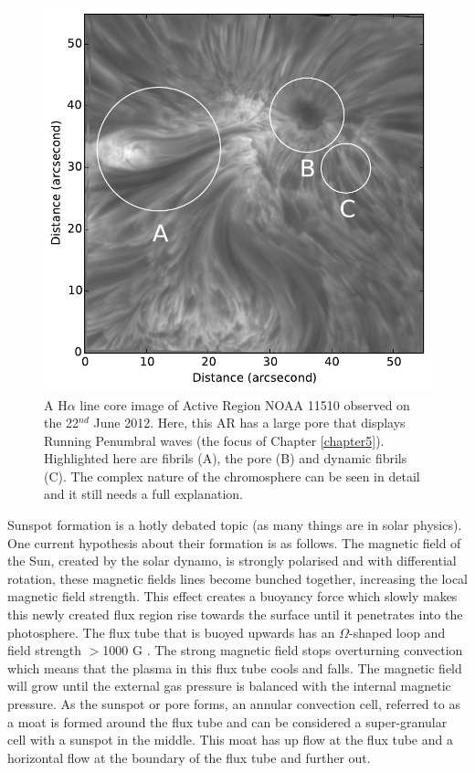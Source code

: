     \begin{figure}
    	\centering
    	\includegraphics[width=\textwidth]{Chromo.pdf}
    	\caption{
    		A H$\alpha$ line core image of Active Region NOAA 11510 observed on the 22$^{{nd}}$ June 2012.
    		Here, this AR has a large pore that displays Running Penumbral waves (the focus of Chapter \ref{chapter5}).
    		Highlighted here are fibrils (A), the pore (B) and dynamic fibrils (C).
    		The complex nature of the chromosphere can be seen in detail and it still needs a full explanation.
    	}
    	\label{fig:chromosphere}
    \end{figure}   
    	
    Sunspot formation is a hotly debated topic (as many things are in solar physics).
    One current hypothesis about their formation is as follows.
    The magnetic field of the Sun, created by the solar dynamo, is strongly polarised and with differential rotation, these magnetic fields lines become bunched together, increasing the local magnetic field strength.
    This effect creates a buoyancy force which slowly makes this newly created flux region rise towards the surface until it penetrates into the photosphere.
    The flux tube that is buoyed upwards has an $\Omega$-shaped loop and field strength $>$1000 G \citep{stix2004sun,2014SoPh..289.3351T}.
    The strong magnetic field stops overturning convection which means that the plasma in this flux tube cools and falls. 
    The magnetic field will grow until the external gas pressure is balanced with the internal magnetic pressure.
    As the sunspot or pore forms, an annular convection cell, referred to as a moat is formed around the flux tube and can be considered a super-granular cell with a sunspot in the middle.
    This moat has up flow at the flux tube and a horizontal flow at the boundary of the flux tube and further out.
    
